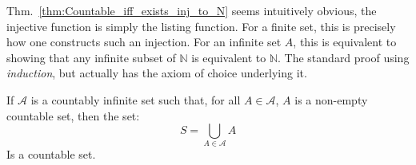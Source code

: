 \documentclass[crop=false,class=book,oneside]{standalone}
\begin{document}
            Thm.~\ref{thm:Countable_iff_exists_inj_to_N} seems
            intuitively obvious, the injective function is
            simply the listing function. For a finite set, this
            is precisely how one constructs such an injection.
            For an infinite set $A$, this is equivalent to
            showing that any infinite subset of $\mathbb{N}$ is
            equivalent to $\mathbb{N}$. The standard proof
            using \textit{induction}, but actually has the axiom
            of choice underlying it.
            \begin{theorem}
                If $\mathcal{A}$ is a countably infinite set
                such that, for all $A\in\mathcal{A}$, $A$ is
                a non-empty countable set, then the set:
                \begin{equation}
                    S=\bigcup_{A\in\mathcal{A}}A
                \end{equation}
                Is a countable set.
            \end{theorem}
\end{document}
